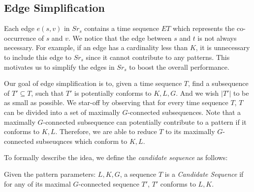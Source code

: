 \subsection{Edge Simplification}
Each edge $e(s,v)$ in $Sr_s$ contains a time sequence $ET$ 
which represents the co-occurrence of $s$ and $v$. We notice that the edge 
between $s$ and $t$ is not always necessary. For example, if an edge has a
cardinality less than $K$, it is unnecessary to include this edge to 
$Sr_s$ since it cannot contribute to any patterns.
This motivates us to simplify the edges in $Sr_s$ 
to boost the overall performance.

Our goal of edge simplification is to, given a time sequence $T$, find a subsequence
of $T' \subseteq T$, such that $T'$ is potentially conforms to $K,L,G$. And we
wish $|T'|$ to be as small as possible.  
We star-off by observing that for every time sequence $T$, $T$ can be 
divided into a set of maximally $G$-connected subsequences. Note that
a maximally $G$-connected subsequence can potentially contribute to
a pattern if it conforms to $K,L$.
Therefore, we are able to reduce $T$
to its maximally $G$-connected subseuqnces which conform to $K,L$.

To formally describe the idea, we define the \emph{candidate sequence} as follows:


%

\begin{definition}
Given the pattern parameters: $L,K,G$, a sequence $T$ is a \emph{Candidate Sequence} 
if for any of its maximal $G$-connected sequence $T'$, $T'$ conforms to $L,K$.
\end{definition}


